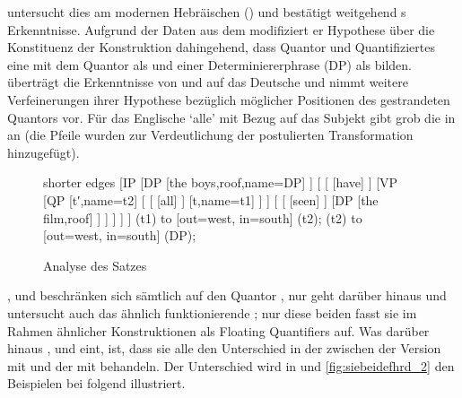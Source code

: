 \citet{shlonsky1991} untersucht dies am modernen Hebräischen () und
bestätigt weitgehend \citeauthor{sportiche1988}s Erkenntnisse.
Aufgrund der Daten aus dem  modifiziert er 
Hypothese über die Konstituenz der Konstruktion dahingehend, dass Quantor und
Quantifiziertes eine  mit dem Quantor als  und
einer Determiniererphrase (DP) als 
bilden. \citet{merchant1996} überträgt die Erkenntnisse von
\citet{sportiche1988} und \citet{shlonsky1991} auf das
Deutsche und nimmt weitere Verfeinerungen ihrer Hypothese
bezüglich möglicher Positionen des gestrandeten Quantors vor. Für
das Englische  `alle' mit Bezug auf das Subjekt gibt
\citet{merchant1996} grob die  in
 an (die Pfeile wurden zur Verdeutlichung der postulierten
Transformation hinzugefügt).

\begin{figure}
	\begin{forest} shorter edges
	[IP
		[DP
			[{the boys},roof,name=DP]
		]
		[
			[
				[have]
			]
			[VP
				[QP
					[t′,name=t2]
					[
						[
							[all]
						]
						[t,name=t1]
					]
				]
				[
					[
						[seen]
					]
					[DP
						[{the film},roof]
					]
				]
			]
		]
	]
	 (t1) to [out=west, in=south] (t2);
	 (t2) to [out=west, in=south] (DP);
	\end{forest}
	\caption{Analyse des Satzes 
	\autocite[nach][180]{merchant1996}}
	\label{fig:qfgg}
\end{figure}

\citet{sportiche1988}, \citet{shlonsky1991} und \citet{merchant1996}
beschränken sich sämtlich auf den Quantor , nur \citet{pittner1995}
geht darüber hinaus und untersucht auch das ähnlich funktionierende ;
nur diese beiden fasst sie im Rahmen ähnlicher Konstruktionen als 
Floating Quantifiers auf. Was darüber hinaus \citeauthor{shlonsky1991},
\citeauthor{pittner1995} und \citeauthor{merchant1996} eint, ist, dass sie alle
den Unterschied in der  zwischen der Version mit
 und der mit  behandeln. Der
Unterschied wird in  und \ref{fig:siebeidefhrd_2}
den Beispielen bei \citet[30--31]{pittner1995} folgend illustriert.

